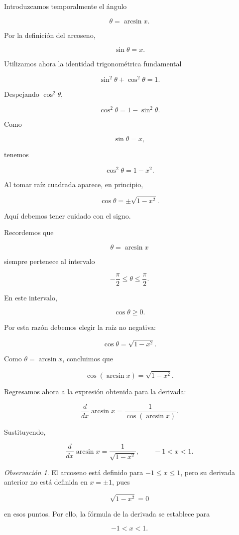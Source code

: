 \documentclass[12pt]{article}
\theoremstyle{definition}
\theoremstyle{remark}
\newtheorem*{observacion}{Observación}
\begin{document}
Introduzcamos temporalmente el ángulo

\[
\theta=\arcsin x.
\]

Por la definición del arcoseno,

\[
\sin\theta=x.
\]

Utilizamos ahora la identidad trigonométrica fundamental

\[
\sin^2\theta+\cos^2\theta=1.
\]

Despejando $\cos^2\theta$,

\[
\cos^2\theta
=
1-\sin^2\theta.
\]

Como

\[
\sin\theta=x,
\]

tenemos

\[
\cos^2\theta
=
1-x^2.
\]

Al tomar raíz cuadrada aparece, en principio,

\[
\cos\theta
=
\pm\sqrt{1-x^2}.
\]

Aquí debemos tener cuidado con el signo.

Recordemos que

\[
\theta=\arcsin x
\]

siempre pertenece al intervalo

\[
-\frac{\pi}{2}
\leq
\theta
\leq
\frac{\pi}{2}.
\]

En este intervalo,

\[
\cos\theta\geq0.
\]

Por esta razón debemos elegir la raíz no negativa:

\[
\cos\theta
=
\sqrt{1-x^2}.
\]

Como $\theta=\arcsin x$, concluimos que

\[
\boxed{
\cos(\arcsin x)
=
\sqrt{1-x^2}.
}
\]

Regresamos ahora a la expresión obtenida para la derivada:

\[
\frac{d}{dx}\arcsin x
=
\frac{1}{\cos(\arcsin x)}.
\]

Sustituyendo,

\[
\boxed{
\frac{d}{dx}\arcsin x
=
\frac{1}{\sqrt{1-x^2}},
\qquad -1<x<1.
}
\]

\begin{observacion}
El arcoseno está definido para $-1\leq x\leq1$, pero su derivada
anterior no está definida en $x=\pm1$, pues

\[
\sqrt{1-x^2}=0
\]

en esos puntos. Por ello, la fórmula de la derivada se establece para

\[
-1<x<1.
\]
\end{observacion}
\end{document}
